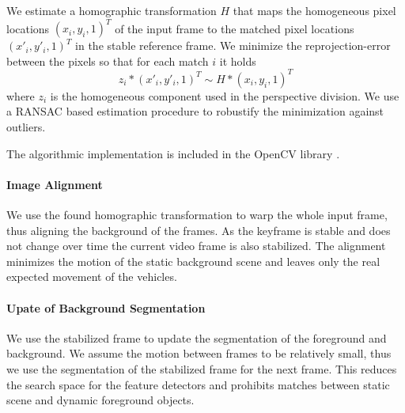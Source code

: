 We estimate a homographic transformation $H$ that maps the homogeneous pixel locations $(x_i, y_i, 1)^T$ of the input frame to the matched pixel locations $(x'_i, y'_i, 1)^T$ in the stable reference frame.
We minimize the reprojection-error between the pixels so that for each match $i$ it holds
\begin{equation}
 z_i  * (x'_i, y'_i, 1)^T \sim H * (x_i, y_i, 1)^T
 \label{eq:dynamic_stabilization_homographic_transformation}
\end{equation}
where $z_i$ is the homogeneous component used in the perspective division. 
We use a RANSAC \cite{fischler1981random} based estimation procedure to robustify the minimization against outliers.

The algorithmic implementation is included in the OpenCV library \cite{opencv_library}.


\paragraph{Image Alignment}
We use the found homographic transformation to warp the whole input frame, thus aligning the background of the frames.
As the keyframe is stable and does not change over time the current video frame is also stabilized.
The alignment minimizes the motion of the static background scene and leaves only the real expected movement of the vehicles.


\paragraph{Upate of Background Segmentation}
We use the stabilized frame to update the segmentation of the foreground and background.
We assume the motion between frames to be relatively small, thus we use the segmentation of the stabilized frame for the next frame.
This reduces the search space for the feature detectors and prohibits matches between static scene and dynamic foreground objects. 
